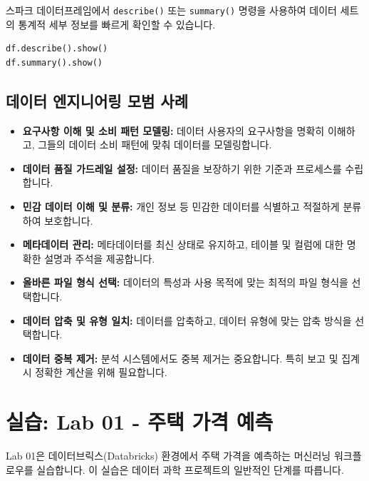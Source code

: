 \documentclass[11pt,a4paper]{article}
\theoremstyle{definition}
\newcommand{\code}[1]{\texttt{#1}}
\begin{document}
\begin{tcolorbox}[example, title=스파크 데이터 프로파일링 예시]
스파크 데이터프레임에서 \code{describe()} 또는 \code{summary()} 명령을 사용하여 데이터 세트의 통계적 세부 정보를 빠르게 확인할 수 있습니다.
\begin{lstlisting}[language=Python, caption=Spark DataFrame 요약 통계]
df.describe().show()
df.summary().show()
\end{lstlisting}
\end{tcolorbox}

\subsection{데이터 엔지니어링 모범 사례}
\begin{itemize}
    \item \textbf{요구사항 이해 및 소비 패턴 모델링:} 데이터 사용자의 요구사항을 명확히 이해하고, 그들의 데이터 소비 패턴에 맞춰 데이터를 모델링합니다.
    \item \textbf{데이터 품질 가드레일 설정:} 데이터 품질을 보장하기 위한 기준과 프로세스를 수립합니다.
    \item \textbf{민감 데이터 이해 및 분류:} 개인 정보 등 민감한 데이터를 식별하고 적절하게 분류하여 보호합니다.
    \item \textbf{메타데이터 관리:} 메타데이터를 최신 상태로 유지하고, 테이블 및 컬럼에 대한 명확한 설명과 주석을 제공합니다.
    \item \textbf{올바른 파일 형식 선택:} 데이터의 특성과 사용 목적에 맞는 최적의 파일 형식을 선택합니다.
    \item \textbf{데이터 압축 및 유형 일치:} 데이터를 압축하고, 데이터 유형에 맞는 압축 방식을 선택합니다.
    \item \textbf{데이터 중복 제거:} 분석 시스템에서도 중복 제거는 중요합니다. 특히 보고 및 집계 시 정확한 계산을 위해 필요합니다.
\end{itemize}

\newpage
\section{실습: Lab 01 - 주택 가격 예측}

Lab 01은 데이터브릭스(Databricks) 환경에서 주택 가격을 예측하는 머신러닝 워크플로우를 실습합니다. 이 실습은 데이터 과학 프로젝트의 일반적인 단계를 따릅니다.
\end{document}
